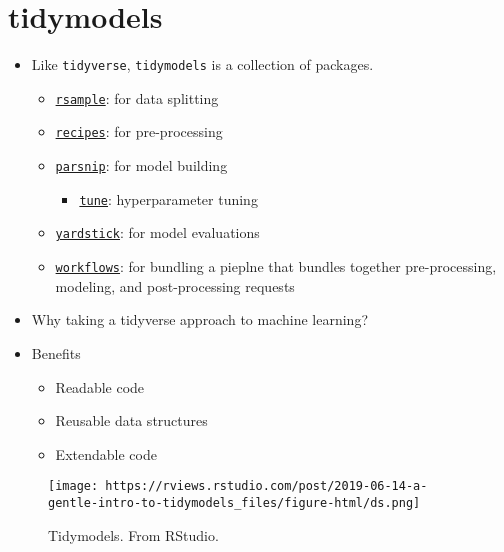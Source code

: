 \documentclass[
]{book}
\providecommand{\tightlist}{%
  \setlength{\itemsep}{0pt}\setlength{\parskip}{0pt}}
\begin{document}
\hypertarget{tidymodels}{%
\section{tidymodels}\label{tidymodels}}

\begin{itemize}
\item
  Like \texttt{tidyverse}, \texttt{tidymodels} is a collection of packages.

  \begin{itemize}
  \item
    \href{https://rsample.tidymodels.org/}{\texttt{rsample}}: for data splitting
  \item
    \href{https://recipes.tidymodels.org/index.html}{\texttt{recipes}}: for pre-processing
  \item
    \href{https://www.tidyverse.org/blog/2018/11/parsnip-0-0-1/}{\texttt{parsnip}}: for model building

    \begin{itemize}
    \tightlist
    \item
      \href{https://github.com/tidymodels/tune}{\texttt{tune}}: hyperparameter tuning
    \end{itemize}
  \item
    \href{https://github.com/tidymodels/yardstick}{\texttt{yardstick}}: for model evaluations
  \item
    \href{https://github.com/tidymodels/workflows}{\texttt{workflows}}: for bundling a pieplne that bundles together pre-processing, modeling, and post-processing requests
  \end{itemize}
\item
  Why taking a tidyverse approach to machine learning?
\item
  Benefits

  \begin{itemize}
  \item
    Readable code
  \item
    Reusable data structures
  \item
    Extendable code
  \end{itemize}
\end{itemize}

\begin{figure}
\centering
\texttt{[image: https://rviews.rstudio.com/post/2019-06-14-a-gentle-intro-to-tidymodels\_files/figure-html/ds.png]}
\caption{Tidymodels. From RStudio.}
\end{figure}
\end{document}
